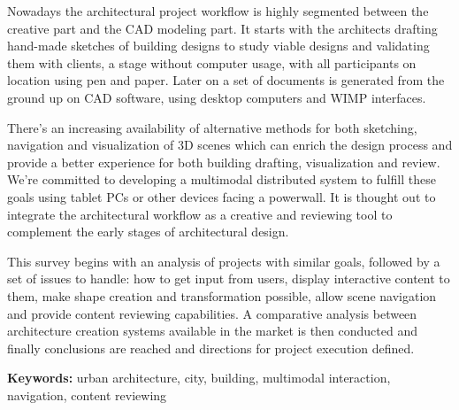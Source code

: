 Nowadays the architectural project workflow is highly segmented
between the creative part and the CAD modeling part.
It starts with the architects drafting hand-made sketches of building designs
to study viable designs and validating them with clients, a stage without computer usage, 
with all participants on location using pen and paper.
Later on a set of documents is generated from the ground up on CAD software, 
using desktop computers and WIMP interfaces.

There's an increasing availability of alternative methods for both sketching, navigation and visualization
of 3D scenes which can enrich the design process and provide a better experience for both
building drafting, visualization and review.
We're committed to developing a multimodal distributed system to fulfill these goals
using tablet PCs or other devices facing a powerwall.
It is thought out to integrate the architectural workflow as a creative and reviewing tool
to complement the early stages of architectural design.

This survey begins with an analysis of projects with similar goals,
followed by a set of issues to handle:
how to get input from users,
display interactive content to them,
make shape creation and transformation possible,
allow scene navigation and
provide content reviewing capabilities.
A comparative analysis between architecture creation systems available in the market is then conducted and
finally conclusions are reached and directions for project execution defined.

\textbf{Keywords:} urban architecture, city, building, multimodal interaction, navigation, content reviewing

